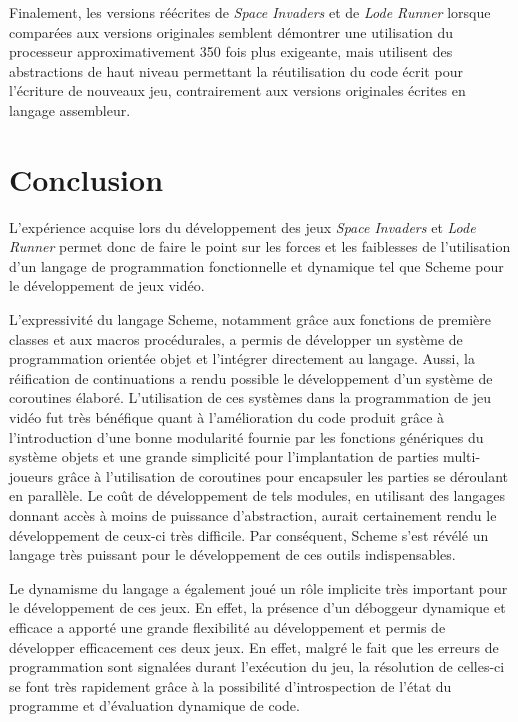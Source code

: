 \documentclass[12pt,twoside,letterpaper,francais]{book}
\begin{document}
Finalement, les versions réécrites de \textit{Space Invaders} et de
\textit{Lode Runner} lorsque comparées aux versions originales
semblent démontrer une utilisation du processeur approximativement 350
fois plus exigeante, mais utilisent des abstractions de haut niveau
permettant la réutilisation du code écrit pour l'écriture de nouveaux
jeu, contrairement aux versions originales écrites en langage
assembleur. 

\clearpage

\chapter{Conclusion}
L'expérience acquise lors du dévelop\-pement des jeux \textit{Space
  Invaders} et \textit{Lode Runner} permet donc de faire le point sur
les forces et les faiblesses de l'utilisation d'un langage de
programmation fonctionnelle et dynamique tel que Scheme pour le
dévelop\-pement de jeux vidéo.

L'expressivité du langage Scheme, notamment grâce aux fonctions
de première classes et aux macros procédurales, a permis de développer
un système de programmation orientée objet et l'intégrer directement
au langage. Aussi, la réification de continuations a rendu possible le
dévelop\-pement d'un système de coroutines élaboré.  L'utilisation de
ces systèmes dans la programmation de jeu vidéo fut très bénéfique
quant à l'amélioration du code produit grâce à l'introduction d'une
bonne modularité fournie par les fonctions génériques du système
objets et une grande simplicité pour l'implantation de parties
multi-joueurs grâce à l'utilisation de coroutines pour encapsuler les
parties se déroulant en parallèle. Le coût de dévelop\-pement de tels
modules, en utilisant des langages donnant accès à moins de puissance
d'abstraction, aurait certainement rendu le dévelop\-pement de ceux-ci
très difficile. Par conséquent, Scheme s'est révélé un langage
très puissant pour le dévelop\-pement de ces outils indispensables.

Le dynamisme du langage a également joué un rôle implicite très
important pour le dévelop\-pement de ces jeux. En effet, la présence
d'un déboggeur dynamique et efficace a apporté une grande flexibilité
au dévelop\-pement et permis de développer efficacement ces deux
jeux. En effet, malgré le fait que les erreurs de programmation sont
signalées durant l'exécution du jeu, la résolution de celles-ci se
font très rapidement grâce à la possibilité d'introspection de l'état
du programme et d'évaluation dynamique de code.
\end{document}
